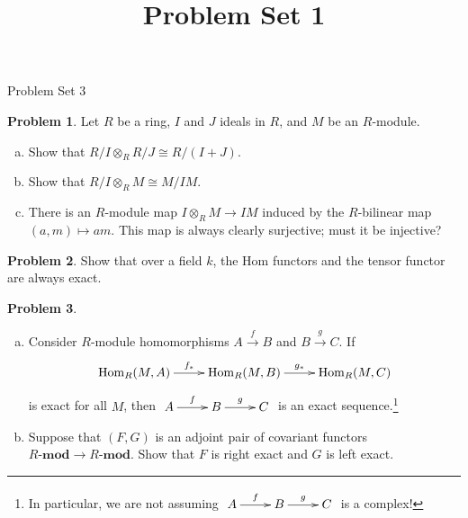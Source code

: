 \documentclass[11pt]{article}
\title{}
\date{\vspace{-0.5in}}
\title{Problem Set 1}
\DeclareMathOperator{\Hom}{Hom}
\theoremstyle{definition}
\newtheorem{problem}{Problem}
\begin{document}
\thispagestyle{fancy}
\pagestyle{fancy}


\begin{center}
	{\LARGE Problem Set 3}
\end{center}



\begin{problem}
Let $R$ be a ring, $I$ and $J$ ideals in $R$, and $M$ be an $R$-module.
\begin{enumerate}[a)]
	\item Show that $R/I \otimes_R R/J \cong R/(I+J)$.
	\item Show that $R/I \otimes_R M \cong M/IM$.
	\item There is an $R$-module map $I \otimes_R M \longrightarrow IM$ induced by the $R$-bilinear map $(a,m) \mapsto am$. This map is always clearly surjective; must it be injective?
\end{enumerate}
\end{problem}

\vfill

\begin{problem}
	Show that over a field $k$, the Hom functors and the tensor functor are always exact.
\end{problem}



\vfill

\begin{problem}$\,$
	\begin{enumerate}[a)]
		\item Consider $R$-module homomorphisms $A \xrightarrow{f} B $ and $B \xrightarrow{g} C$. If
		$$\xymatrix{\Hom_R(M,A) \ar[r]^{f_*} & \Hom_R(M,B) \ar[r]^-{g_*} & \Hom_R(M,C)}$$
		is exact for all $M$, then $\xymatrix{A \ar[r]^-f & B \ar[r]^-g & C}$ is an exact sequence.\footnote{In particular, we are not assuming $\xymatrix{A \ar[r]^-f & B \ar[r]^-g & C}$ is a complex!}
		\item Suppose that $(F,G)$ is an adjoint pair of covariant functors $R\textbf{-mod} \longrightarrow R\textbf{-mod}$. Show that $F$ is right exact and $G$ is left exact.
	\end{enumerate}
\end{problem}



\vspace{2em}

\noindent
{} 
\end{document}
